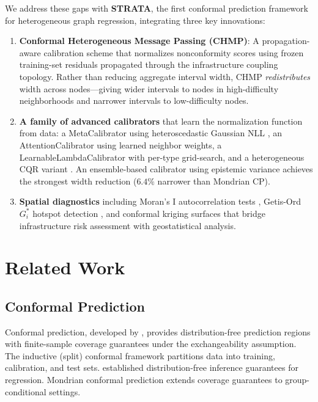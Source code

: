 \documentclass[twoside,11pt]{article}
\begin{document}
We address these gaps with \textbf{STRATA}, the first conformal prediction
framework for heterogeneous graph regression, integrating
three key innovations:

\begin{enumerate}
\item \textbf{Conformal Heterogeneous Message Passing (CHMP)}: A
propagation-aware calibration scheme that normalizes nonconformity scores using
frozen training-set residuals propagated through the infrastructure coupling
topology. Rather than reducing aggregate interval width, CHMP
\emph{redistributes} width across nodes---giving wider intervals to nodes in
high-difficulty neighborhoods and narrower intervals to low-difficulty nodes.

\item \textbf{A family of advanced calibrators} that learn the normalization
function from data: a MetaCalibrator using heteroscedastic Gaussian NLL
\citep{kendall2017uncertainties}, an AttentionCalibrator using learned neighbor
weights, a LearnableLambdaCalibrator with per-type grid-search, and a
heterogeneous CQR variant \citep{romano2019conformalized}. An ensemble-based
calibrator using epistemic variance \citep{lakshminarayanan2017simple} achieves
the strongest width reduction ($6.4\%$ narrower than Mondrian CP).

\item \textbf{Spatial diagnostics} including Moran's I autocorrelation tests
\citep{moran1950notes}, Getis-Ord $G_i^*$ hotspot detection
\citep{getis1992analysis}, and conformal kriging surfaces \citep{cressie1993statistics}
that bridge infrastructure risk assessment with geostatistical analysis.
\end{enumerate}

\section{Related Work}
\label{sec:related}

\subsection{Conformal Prediction}

Conformal prediction, developed by \citet{vovk2005algorithmic}, provides
distribution-free prediction regions with finite-sample coverage guarantees under
the exchangeability assumption. The inductive (split) conformal framework
\citep{papadopoulos2002inductive} partitions data into training, calibration,
and test sets. \citet{lei2018distribution} established distribution-free
inference guarantees for regression. Mondrian conformal prediction
\citep{vovk2012conditional} extends coverage guarantees to group-conditional
settings.
\end{document}
